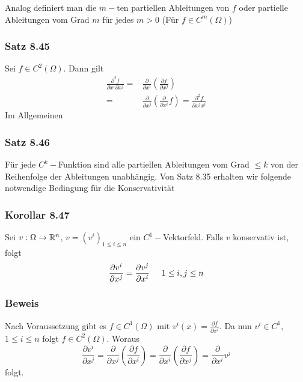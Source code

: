 Analog definiert man die $m-$ten partiellen Ableitungen von $f$ oder partielle Ableitungen vom Grad $m$ für jedes $m>0$ (Für $f\in C^m \left(\Omega\right)$)

\subsubsection*{Satz 8.45}
Sei $f\in C^2\left(\Omega\right)$. Dann gilt
\begin{align*}
\frac{{{\partial ^2}f}}{{\partial {x^i}\partial {x^j}}} = &\frac{\partial }{{\partial {x^i}}}\left( {\frac{{\partial f}}{{\partial {x^j}}}} \right)\\
 = &\frac{\partial }{{\partial {x^j}}}\left( {\frac{\partial }{{\partial {x^i}}}f} \right) = \frac{{{\partial ^2}f}}{{\partial {x^j}{x^i}}}
\end{align*}
Im Allgemeinen
\subsubsection*{Satz 8.46}
Für jede $C^k-$Funktion sind alle partiellen Ableitungen vom Grad $\leq k$ von der Reihenfolge der Ableitungen unabhängig. Von Satz 8.35 erhalten wir folgende notwendige Bedingung für die Konservativität

\subsubsection*{Korollar 8.47}
Sei $v:\Omega\to\mathbb{R}^n$, $v={\left( v^i\right)}_{1\leq i \leq n}$ ein $C^1-$Vektorfeld. Falls $v$ konservativ ist, folgt
\[\frac{{\partial {v^i}}}{{\partial {x^j}}} = \frac{{\partial {v^j}}}{{\partial {x^i}}}\hspace{5mm}1 \le i,j \le n\]

\subsubsection*{Beweis}
Nach Voraussetzung gibt es $f\in C^1\left( \Omega\right)$ mit $v^i(x)=\frac{\partial f}{\partial x^i}$. Da nun $v^i \in C^1$, $1\leq i\leq n$ folgt $f\in C^2\left( \Omega\right)$. Woraus
\[\frac{{\partial {v^i}}}{{\partial {x^j}}} = \frac{\partial }{{\partial {x^j}}}\left( {\frac{{\partial f}}{{\partial {x^i}}}} \right) = \frac{\partial }{{\partial {x^i}}}\left( {\frac{{\partial f}}{{\partial {x^j}}}} \right) = \frac{\partial }{{\partial {x^i}}}{v^j}\]
folgt.

